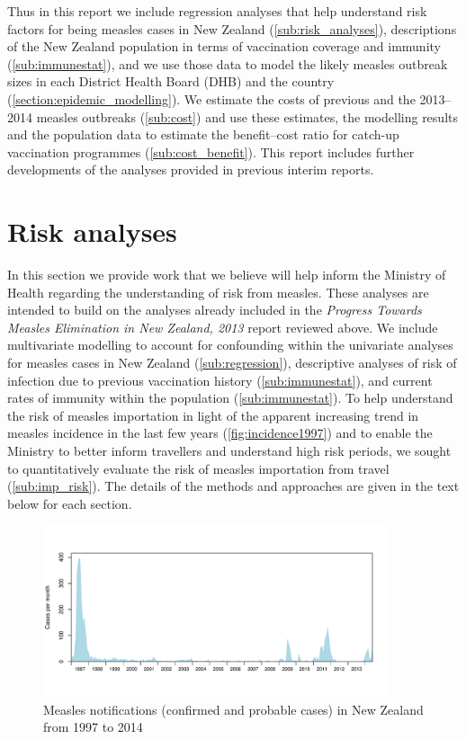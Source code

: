 \documentclass{article}
\begin{document}
Thus in this report we include regression analyses that help understand risk factors for being measles cases in New Zealand (\autoref{sub:risk_analyses}), descriptions of the New Zealand population in terms of vaccination coverage and immunity (\autoref{sub:immunestat}), and we use those data to model the likely measles outbreak sizes in each District Health Board (DHB) and the country (\autoref{section:epidemic_modelling}). We estimate the costs of previous and the 2013--2014 measles outbreaks (\autoref{sub:cost}) and use these estimates, the modelling results and the population data to estimate the benefit--cost ratio for catch-up vaccination programmes (\autoref{sub:cost_benefit}). This report includes further developments of the analyses provided in previous interim reports.

\section{Risk analyses}
\label{sub:risk_analyses}

In this section we provide work that we believe will help inform the Ministry of Health regarding the understanding of risk from measles. These analyses are intended to build on the analyses already included in the \emph {Progress Towards Measles Elimination in New Zealand, 2013} report reviewed above. We include multivariate modelling to account for confounding within the univariate analyses for measles cases in New Zealand (\autoref{sub:regression}), descriptive analyses of risk of infection due to previous vaccination history (\autoref{sub:immunestat}), and current rates of immunity within the population (\autoref{sub:immunestat}). To help understand the risk of measles importation in light of the apparent increasing trend in measles incidence in the last few years (\autoref{fig:incidence1997}) and to enable the Ministry to better inform travellers and understand high risk periods, we sought to quantitatively evaluate the risk of measles importation from travel (\autoref{sub:imp_risk}). The details of the methods and approaches are given in the text below for each section.

\begin{figure}
     \includegraphics[width=0.9\textwidth]{incidence_1997_2014.pdf}
     \caption{Measles notifications (confirmed and probable cases) in New Zealand from 1997 to 2014}
     \label{fig:incidence1997}
\end{figure}
\end{document}
